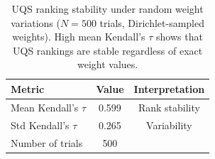 \begin{table}[t]
\centering
\caption{UQS ranking stability under random weight variations ($N=500$ trials, Dirichlet-sampled weights). High mean Kendall's $\tau$ shows that UQS rankings are stable regardless of exact weight values.}
\label{tab:uqs_ablation}
\begin{tabular}{lcc}
\toprule
\textbf{Metric} & \textbf{Value} & \textbf{Interpretation} \\
\midrule
Mean Kendall's $\tau$ & 0.599 & Rank stability \\
Std Kendall's $\tau$ & 0.265 & Variability \\
Number of trials & 500 & \\
\bottomrule
\end{tabular}
\end{table}